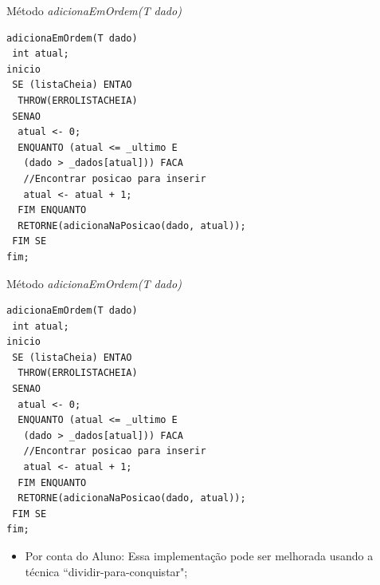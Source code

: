 \documentclass[12pt,table,xcolor={dvipsnames}]{beamer}
\begin{document}
\begin{frame}[fragile]{Método \textit{adicionaEmOrdem(T dado)}}
\begin{lstlisting}
adicionaEmOrdem(T dado)
 int atual;
inicio
 SE (listaCheia) ENTAO
  THROW(ERROLISTACHEIA)
 SENAO
  atual <- 0;
  ENQUANTO (atual <= _ultimo E
   (dado > _dados[atual])) FACA
   //Encontrar posicao para inserir
   atual <- atual + 1;
  FIM ENQUANTO
  RETORNE(adicionaNaPosicao(dado, atual));
 FIM SE
fim;
\end{lstlisting}
\end{frame}

\begin{frame}[fragile]{Método \textit{adicionaEmOrdem(T dado)}}
\begin{lstlisting}
adicionaEmOrdem(T dado)
 int atual;
inicio
 SE (listaCheia) ENTAO
  THROW(ERROLISTACHEIA)
 SENAO
  atual <- 0;
  ENQUANTO (atual <= _ultimo E
   (dado > _dados[atual])) FACA
   //Encontrar posicao para inserir
   atual <- atual + 1;
  FIM ENQUANTO
  RETORNE(adicionaNaPosicao(dado, atual));
 FIM SE
fim;
\end{lstlisting}
\begin{itemize}
\item Por conta do Aluno: Essa implementação pode ser melhorada usando a técnica ``dividir-para-conquistar";
\end{itemize}
\end{frame}
\end{document}
